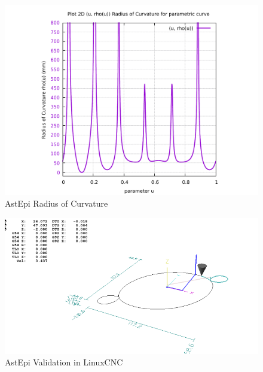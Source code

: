 \begin{figure}
	\caption     {AstEpi Radius of Curvature}
	\label{02-img-AstEpi Radius of Curvature.pdf}
\includegraphics[width=1.00\textwidth]{Chap4/appendix/app-AstEpi/plots/02-img-AstEpi Radius of Curvature.pdf} 
\end{figure}	


\clearpage
\pagebreak

\begin{figure}
	\caption     {AstEpi Validation in LinuxCNC}
	\label{03-img-AstEpi-Validation-in-LinuxCNC.png}
\includegraphics[width=1.00\textwidth]{Chap4/appendix/app-AstEpi/plots/03-img-AstEpi-Validation-in-LinuxCNC.png}
\end{figure}


